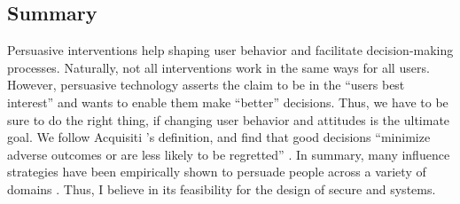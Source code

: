 		

	
	\subsection{Summary}
	Persuasive interventions help shaping user behavior and facilitate decision-making processes. Naturally, not all interventions work in the same ways for all users. However, persuasive technology asserts the claim to be in the ``users best interest'' and wants to enable them make ``better'' decisions. Thus, we have to be sure to do the right thing, if changing user behavior and attitudes is the ultimate goal. We follow Acquisiti \etal's definition, and find that good decisions ``minimize adverse outcomes or are less likely to be regretted'' \cite{Acquisti2017NudgesPrivacySecurity}. In summary, many influence strategies have been empirically shown to persuade people across a variety of domains \cite{Hamari2014DoPersuasiveTechnologies}. Thus, I believe in its feasibility for the design of secure and systems. 